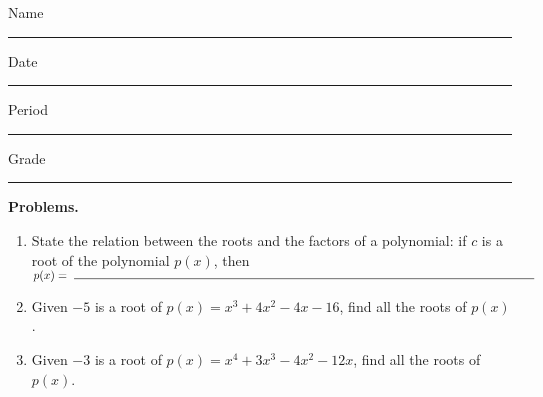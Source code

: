 \documentclass[10pt]{article}
\title{}
\date{}
\begin{document}
\noindent
{
Name \rule{16em}{.5pt} Date \rule{8em}{.5pt} Period \rule{4em}{.5pt} Grade  \rule{4em}{.5pt}
}
\vspace{1em}

{\noindent\bf Problems.}

\begin{enumerate}
    \item State the relation between the roots and the factors of a polynomial: if $c$ is a root of the polynomial \(p(x)\), then\\[1em] \(\displaystyle p(x) =\ \rule{40em}{0.5pt}\)
    \item Given $-5$ is a root of \(p(x) =x^3 + 4 x^2 - 4 x - 16\), find all the roots of \(p(x)\).
    \item  Given $-3$ is a root of \(p(x) =x^4 + 3 x^3 - 4 x^2 - 12 x\), find all the roots of \(p(x)\).

\end{enumerate}
\end{document}
